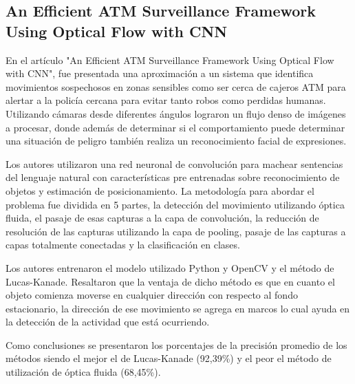 \subsection{An Efficient ATM Surveillance
            Framework Using Optical Flow
            with CNN
}

En el artículo "An Efficient ATM Surveillance
Framework Using Optical Flow
with CNN"\cite[pág. 39]{chaudharyMicroservices2020}, fue presentada una aproximación a un sistema que identifica movimientos sospechosos en zonas sensibles como ser cerca de cajeros ATM para alertar a la policía cercana para evitar tanto robos como perdidas humanas.
Utilizando cámaras desde diferentes ángulos lograron un flujo denso de imágenes a procesar, donde además de determinar si el comportamiento puede determinar una situación de peligro también realiza un reconocimiento facial de expresiones.
\par

Los autores utilizaron una red neuronal de convolución para machear sentencias del lenguaje natural con
características pre entrenadas sobre reconocimiento de objetos y estimación de posicionamiento.
La metodología para abordar el problema fue dividida en 5 partes, la detección del movimiento utilizando óptica fluida, el pasaje de esas capturas a la capa de convolución, la reducción de resolución de las capturas utilizando la capa de pooling, pasaje de las capturas a capas totalmente conectadas y la clasificación en clases.
\par

Los autores entrenaron el modelo utilizado Python y OpenCV y el método de Lucas-Kanade.
Resaltaron que la ventaja de dicho método es que en cuanto el objeto comienza
moverse en cualquier dirección con respecto al fondo estacionario, la dirección de
ese movimiento se agrega en marcos lo cual ayuda en la detección de la actividad que está ocurriendo.
\par

Como conclusiones se presentaron los porcentajes de la precisión promedio de los métodos siendo el mejor el de Lucas-Kanade (92,39\%) y el peor el método de utilización de óptica fluida (68,45\%).
\par
